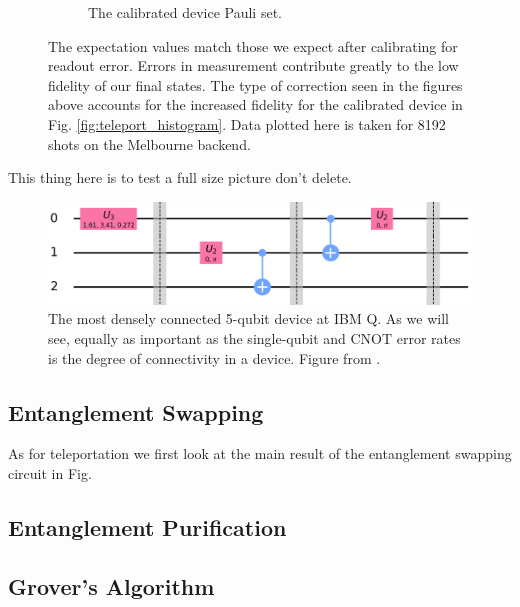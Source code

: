 \begin{figure}
\begin{subfigure}{.5\textwidth}
    \caption{The calibrated device Pauli set.}
    \label{fig:tele_pauli_dev}
  \end{subfigure}
  \caption{The expectation values match those we expect after calibrating for
readout error. Errors in measurement contribute greatly to the low fidelity of
our final states. The type of correction seen in the figures above accounts for
the increased fidelity for the calibrated device in Fig.
\ref{fig:teleport_histogram}. Data plotted here is taken for 8192 shots on the
Melbourne backend.}
  \label{fig:tele_paulis}
\end{figure}


This thing here is to test a full size picture don't delete.
\begin{figure}
  \centering
  \includegraphics[width=\textwidth]{images/teleport_ibmqx2.png}
  \caption{The most densely connected 5-qubit device at IBM Q. As we will see,
    equally as important as the single-qubit and CNOT error rates is the degree of
    connectivity in a device. Figure from \cite{ibmq_yorktown}.}
  \label{fig:yorktown_connections}
\end{figure}



\subsection{Entanglement Swapping}
As for teleportation we first look at the main result of the entanglement swapping circuit in Fig. 
\subsection{Entanglement Purification}
\subsection{Grover's Algorithm}


